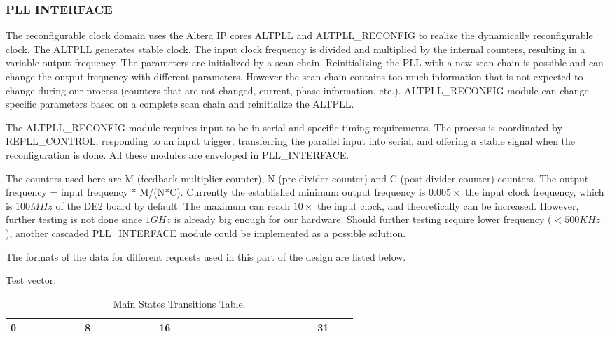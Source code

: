 \subsubsection{PLL INTERFACE}

The reconfigurable clock domain uses the Altera IP cores ALTPLL and ALTPLL\_RECONFIG to realize the dynamically reconfigurable clock. The ALTPLL generates stable clock. The input clock frequency is divided and multiplied by the internal counters, resulting in a variable output frequency. The parameters are initialized by a scan chain. Reinitializing the PLL with a new scan chain is possible and can change the output frequency with different parameters. However the scan chain contains too much information that is not expected to change during our process (counters that are not changed, current, phase information, etc.). ALTPLL\_RECONFIG module can change specific parameters based on a complete scan chain and reinitialize the ALTPLL.

The ALTPLL\_RECONFIG module requires input to be in serial and specific timing requirements. The process is coordinated by REPLL\_CONTROL, responding to an input trigger, transferring the parallel input into serial, and offering a stable signal when the reconfiguration is done. All these modules are enveloped in PLL\_INTERFACE.

The counters used here are M (feedback multiplier counter), N (pre-divider counter) and C (post-divider counter) counters. The output frequency = input frequency * M/(N*C). Currently the established minimum output frequency is $0.005\times$ the input clock frequency, which is $100MHz$ of the DE2 board by default. The maximum can reach $10\times$ the input clock, and theoretically can be increased. However, further testing is not done since $1GHz$ is already big enough for our hardware. Should further testing require lower frequency ($<500KHz$ ), another cascaded PLL\_INTERFACE module could be implemented as a possible solution.

The formats of the data for different requests used in this part of the design are listed below.


Test vector:

\begin{table}[ht]
\centering
\begin{tabular}{|c|c|c|c|c|c|c|c|c|c|c|c|c|c|c|c|c|c|c|c|c|c|c|c|c|c|c|c|c|c|c|c|}
\hline
0 & & & & & & & 8 & & & & & & & 16 & & & & & & & & & & & & & & & 31 \\
\hline

\end{tabular}
\caption{Main States Transitions Table.}
\label{tab:stafddftes_transitions}
\end{table}








